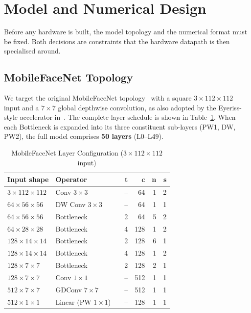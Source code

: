 \section{Model and Numerical Design}
\label{sec:model}

Before any hardware is built, the model topology and the numerical format must be fixed. Both decisions are constraints that the hardware datapath is then specialised around.

\subsection{MobileFaceNet Topology}
\label{sec:model:topology}

We target the original MobileFaceNet topology~\cite{chen2018mobilefacenetsefficientcnnsaccurate} with a square $3\times112\times112$ input and a $7\times7$ global depthwise convolution, as also adopted by the Eyeriss-style accelerator in~\cite{7738524}. The complete layer schedule is shown in Table~\ref{tab:mobile}. When each Bottleneck is expanded into its three constituent sub-layers (PW1, DW, PW2), the full model comprises \textbf{50 layers} (L0--L49).

\begin{table}[H]
\centering
\caption{MobileFaceNet Layer Configuration ($3\times112\times112$ input)}
\label{tab:mobile}
\begin{tabular}{lllrrrr}
\toprule
\textbf{Input shape} & \textbf{Operator} & & \textbf{t} & \textbf{c} & \textbf{n} & \textbf{s} \\
\midrule
$3\times112\times112$   & Conv $3\times3$        & & --  & 64  & 1 & 2 \\
$64\times56\times56$    & DW Conv $3\times3$     & & --  & 64  & 1 & 1 \\
$64\times56\times56$    & Bottleneck             & & 2   & 64  & 5 & 2 \\
$64\times28\times28$    & Bottleneck             & & 4   & 128 & 1 & 2 \\
$128\times14\times14$   & Bottleneck             & & 2   & 128 & 6 & 1 \\
$128\times14\times14$   & Bottleneck             & & 4   & 128 & 1 & 2 \\
$128\times7\times7$     & Bottleneck             & & 2   & 128 & 2 & 1 \\
$128\times7\times7$     & Conv $1\times1$        & & --  & 512 & 1 & 1 \\
$512\times7\times7$     & GDConv $7\times7$      & & --  & 512 & 1 & 1 \\
$512\times1\times1$     & Linear (PW $1\times1$) & & --  & 128 & 1 & 1 \\
\bottomrule
\end{tabular}
\end{table}

